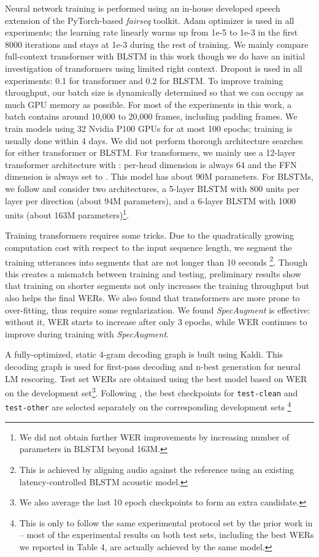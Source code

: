 \documentclass{article}
\begin{document}
Neural network training is performed using an in-house developed speech extension of the PyTorch-based \emph{fairseq}\cite{ott2019fairseq} toolkit. 
Adam optimizer \cite{kingma2014adam} is used in all experiments; the learning rate linearly warms up from 1e-5 to 1e-3 in the first 8000 iterations and stays at 1e-3 during the rest of training. We mainly compare full-context transformer with BLSTM in this work though we do have an initial investigation of transformers using limited right context. Dropout is used in all experiments: 0.1 for transformer and 0.2 for BLSTM. To improve training throughput, our batch size is dynamically determined so that we can occupy as much GPU memory as possible. For most of the experiments in this work, a batch contains around 10,000 to 20,000 frames, including padding frames. We train models using 32 Nvidia P100 GPUs for at most 100 epochs; training is usually done within 4 days. We did not perform thorough architecture searches for either transformer or BLSTM. For transformers, we mainly use a 12-layer transformer architecture with : per-head dimension is always 64 and the FFN dimension is always set to . This model has about 90M parameters. For BLSTMs, we follow \cite{le2019senones} and consider two architectures, a 5-layer BLSTM with 800 units per layer per direction (about 94M parameters), and a 6-layer BLSTM with 1000 units (about 163M parameters)\footnote{We did not obtain further WER improvements by increasing number of parameters in BLSTM beyond 163M.}. 

Training transformers requires some tricks. Due to the quadratically growing computation cost with respect to the input sequence length, we segment the training utterances into segments that are not longer than 10 seconds \footnote{
This is achieved by aligning audio against the reference using an existing latency-controlled BLSTM acoustic model. }. Though this creates a mismatch between training and testing, preliminary results show that training on shorter segments not only increases the training throughput but also helps the final WERs. We also found that transformers are more prone to over-fitting, thus require some regularization. We found \emph{SpecAugment}\cite{park2019specaugment} is effective: without it, WER starts to increase after only 3 epochs, while WER continues to improve during training with \emph{SpecAugment}.

A fully-optimized, static 4-gram decoding graph is built using Kaldi. This decoding graph is used for first-pass decoding and n-best generation for neural LM rescoring. Test set WERs are obtained using the best model based on WER on the development set\footnote{We also average the last 10 epoch checkpoints to form an extra candidate.}. 
Following \cite{luscher2019rwth}, the best checkpoints for \texttt{test-clean} and \texttt{test-other} are selected separately on the corresponding development sets \footnote{This is only to follow the same experimental protocol set by the prior work in \cite{luscher2019rwth} -- most of the experimental results on both test sets, including the best WERs we reported in Table 4, are actually achieved by the same model.} 
\end{document}
